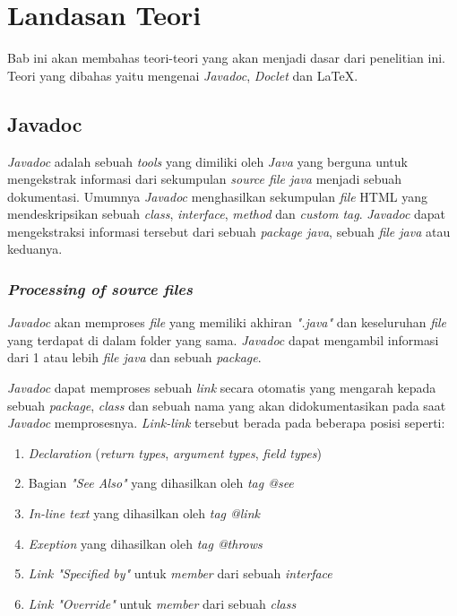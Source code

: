 \lstset{style=mystyle}
\chapter{Landasan Teori}
\label{chap:teori}
Bab ini akan membahas teori-teori yang akan menjadi dasar dari penelitian ini. Teori yang dibahas yaitu mengenai {\it Javadoc}, {\it Doclet} dan \LaTeX .

\section{Javadoc}
\label{sec:javadoc} 
{\it Javadoc} adalah sebuah {\it tools} yang dimiliki oleh {\it Java} yang berguna untuk mengekstrak informasi dari sekumpulan {\it source file java} menjadi sebuah dokumentasi. Umumnya {\it Javadoc} menghasilkan sekumpulan {\it file} HTML yang mendeskripsikan sebuah {\it class}, {\it interface}, {\it method} dan {\it custom tag}. {\it Javadoc} dapat mengekstraksi informasi tersebut dari sebuah {\it package java}, sebuah {\it file java} atau keduanya. ~\cite{javadoc:01:javadoc}

\subsection{\textit{Processing of source files}}
\label{sec:javadoc}
{\it Javadoc} akan memproses {\it file} yang memiliki akhiran {\it ".java"} dan keseluruhan {\it file} yang terdapat di dalam folder yang sama. {\it Javadoc} dapat mengambil informasi dari 1 atau lebih {\it file java} dan sebuah {\it package}.

{\it Javadoc} dapat memproses sebuah {\it link} secara otomatis yang mengarah kepada sebuah {\it package}, {\it class} dan sebuah nama yang akan didokumentasikan pada saat {\it Javadoc} memprosesnya. {\it Link-link} tersebut berada pada beberapa posisi seperti:
\begin{enumerate}
	\item {\it Declaration} ({\it return types}, {\it argument types}, {\it field types})
	\item Bagian {\it "See Also"} yang dihasilkan oleh {\it tag @see}
	\item {\it In-line text} yang dihasilkan oleh {\it tag {@link}}
	\item {\it Exeption} yang dihasilkan oleh {\it tag @throws}
	\item {\it Link "Specified by"} untuk {\it member} dari sebuah {\it interface}
	\item {\it Link "Override"} untuk {\it member} dari sebuah {\it class}
\end{enumerate}

